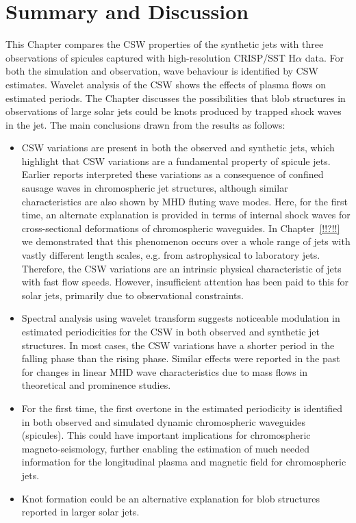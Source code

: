 \documentclass[12pt]{ociamthesis}
\begin{document}
\section{Summary and Discussion}
\label{sec:sum}
This Chapter compares the CSW properties of the synthetic jets with three observations of spicules captured with high-resolution CRISP/SST H$\alpha$ data. For both the simulation and observation, wave behaviour is identified by CSW estimates. Wavelet analysis of the CSW shows the effects of plasma flows on estimated periods. The Chapter discusses the possibilities that blob structures in observations of large solar jets could be knots produced by trapped shock waves in the jet. The main conclusions drawn from the results as follows:
\begin{itemize}
    \item{CSW variations are present in both the observed and synthetic jets, which highlight that CSW variations are a fundamental property of spicule jets. Earlier reports interpreted these variations as a consequence of confined sausage waves in chromospheric jet structures, although similar characteristics are also shown by MHD fluting wave modes. Here, for the first time, an alternate explanation is provided in terms of internal shock waves for cross-sectional deformations of chromospheric waveguides. In Chapter~\ref{!!?!!} we demonstrated that this phenomenon occurs over a whole range of jets with vastly different length scales, e.g. from astrophysical to laboratory jets. Therefore, the CSW variations are an intrinsic physical characteristic of jets with fast flow speeds. However, insufficient attention has been paid to this for solar jets, primarily due to observational constraints.}

    \item{Spectral analysis using wavelet transform suggests noticeable modulation in estimated periodicities for the CSW in both observed and synthetic jet structures. In most cases, the CSW variations have a shorter period in the falling phase than the rising phase. Similar effects were reported in the past for changes in linear MHD wave characteristics due to mass flows in theoretical and prominence studies.}

    \item{For the first time, the first overtone in the estimated periodicity is identified in both observed and simulated dynamic chromospheric waveguides (spicules). This could have important implications for chromospheric magneto-seismology, further enabling the estimation of much needed information for the longitudinal plasma and magnetic field for chromospheric jets.}
    
    \item{Knot formation could be an alternative explanation for blob structures reported in larger solar jets.}
\end{itemize}
\end{document}
